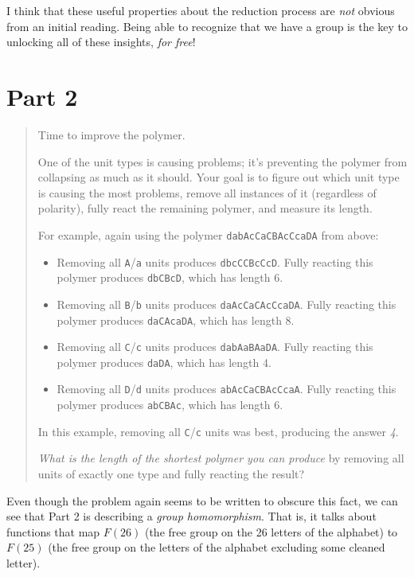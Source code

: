 \documentclass[]{article}
\begin{document}
I think that these useful properties about the reduction process are \emph{not}
obvious from an initial reading. Being able to recognize that we have a group is
the key to unlocking all of these insights, \emph{for free}!

\hypertarget{part-2}{%
\section{Part 2}\label{part-2}}

\begin{quote}
Time to improve the polymer.

One of the unit types is causing problems; it's preventing the polymer from
collapsing as much as it should. Your goal is to figure out which unit type is
causing the most problems, remove all instances of it (regardless of polarity),
fully react the remaining polymer, and measure its length.

For example, again using the polymer \texttt{dabAcCaCBAcCcaDA} from above:

\begin{itemize}
\tightlist
\item
  Removing all \texttt{A}/\texttt{a} units produces \texttt{dbcCCBcCcD}. Fully
  reacting this polymer produces \texttt{dbCBcD}, which has length 6.
\item
  Removing all \texttt{B}/\texttt{b} units produces \texttt{daAcCaCAcCcaDA}.
  Fully reacting this polymer produces \texttt{daCAcaDA}, which has length 8.
\item
  Removing all \texttt{C}/\texttt{c} units produces \texttt{dabAaBAaDA}. Fully
  reacting this polymer produces \texttt{daDA}, which has length 4.
\item
  Removing all \texttt{D}/\texttt{d} units produces \texttt{abAcCaCBAcCcaA}.
  Fully reacting this polymer produces \texttt{abCBAc}, which has length 6.
\end{itemize}

In this example, removing all \texttt{C}/\texttt{c} units was best, producing
the answer \emph{4}.

\emph{What is the length of the shortest polymer you can produce} by removing
all units of exactly one type and fully reacting the result?
\end{quote}

Even though the problem again seems to be written to obscure this fact, we can
see that Part 2 is describing a \emph{group homomorphism}. That is, it talks
about functions that map \(F(26)\) (the free group on the 26 letters of the
alphabet) to \(F(25)\) (the free group on the letters of the alphabet excluding
some cleaned letter).
\end{document}
